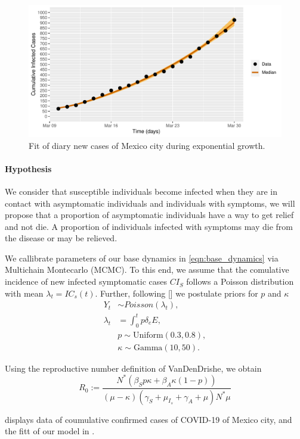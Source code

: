 %
\begin{figure}[htb]
	\centering
   	\includegraphics[scale=0.8, keepaspectratio]{./cdmx_CIs_data_begining_fit}
   	\caption{%
   		Fit of diary new cases of Mexico city
   		during exponential growth.
   	}
    \label{fig:data_CDMX_fitting}
\end{figure}
%
    \paragraph{Hypothesis}
    	We consider that susceptible individuals become
    infected when they are in contact with asymptomatic individuals and
    individuals with symptoms, we will propose that a proportion of
    asymptomatic individuals have a way to get relief and not die. A
    proportion of individuals infected with symptoms may die from the
    disease or may be relieved.

        We callibrate parameters of our base dynamics in
    \eqref{eqn:base_dynamics} via Multichain Montecarlo (MCMC).
    To this end, we assume that the comulative
    incidence of new infected symptomatic cases $CI_S$
    follows a Poisson distribution with mean $\lambda_t = IC_s(t)$. Further,
    following [] we postulate priors for $p$ and $\kappa$
    \begin{equation}
        \label{eqn:boservation_model}
        \begin{aligned}
            Y_t & \sim Poisson(\lambda_t),
    		\\
    		\lambda_t
    			&=
    			\int_{0}^t p \delta_e E ,
    		\\
    			& p \sim \text{Uniform} (0.3, 0.8),
    		\\
    			& \kappa \sim \text{Gamma}(10, 50).
    	\end{aligned}
    \end{equation}

	Using the reproductive number definition of VanDenDrishe, we obtain
\begin{equation*}
	\label{eqn:reproductive_number}
	R_0 :=
		\frac{
			N^{*}(
				\beta_S p
				\kappa +
				\beta_A
				\kappa(1-p) )
		}{
			(\mu - \kappa)( \gamma_S + \mu_{I_s} + \gamma_A + \mu)
			N^* \mu
		}
\end{equation*}

     displays data of coumulative confirmed cases
of COVID-19 of Mexico city, and the fitt of our model in
.
